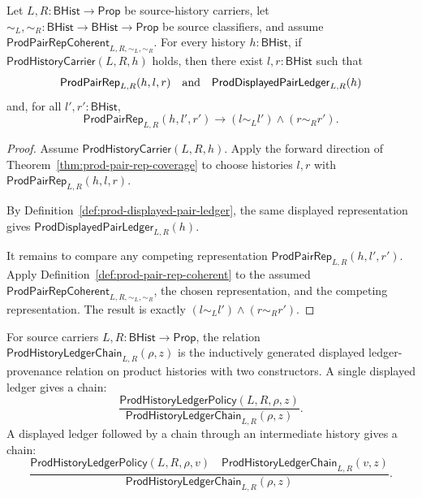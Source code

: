 \begin{theorem}
\label{thm:prod-carrier-single-valued-displayed-pair-readback}
Let $L,R:\mathsf{BHist}\to\mathsf{Prop}$ be source-history carriers, let
$\sim_L,\sim_R:\mathsf{BHist}\to\mathsf{BHist}\to\mathsf{Prop}$ be source
classifiers, and assume $\mathsf{ProdPairRepCoherent}_{L,R,\sim_L,\sim_R}$.
For every history $h:\mathsf{BHist}$, if
$\mathsf{ProdHistoryCarrier}(L,R,h)$ holds, then there exist
$l,r:\mathsf{BHist}$ such that
$$
\mathsf{ProdPairRep}_{L,R}(h,l,r)
\quad\hbox{and}\quad
\mathsf{ProdDisplayedPairLedger}_{L,R}(h)
$$
and, for all $l',r':\mathsf{BHist}$,
$$
\mathsf{ProdPairRep}_{L,R}(h,l',r')
\to
(l\sim_L l')\wedge(r\sim_R r').
$$
\end{theorem}
\begin{proof}
Assume $\mathsf{ProdHistoryCarrier}(L,R,h)$. Apply the forward direction of
Theorem~\ref{thm:prod-pair-rep-coverage} to choose histories $l,r$ with
$\mathsf{ProdPairRep}_{L,R}(h,l,r)$.

By Definition~\ref{def:prod-displayed-pair-ledger}, the same displayed
representation gives $\mathsf{ProdDisplayedPairLedger}_{L,R}(h)$.

It remains to compare any competing representation
$\mathsf{ProdPairRep}_{L,R}(h,l',r')$. Apply
Definition~\ref{def:prod-pair-rep-coherent} to the assumed
$\mathsf{ProdPairRepCoherent}_{L,R,\sim_L,\sim_R}$, the chosen representation,
and the competing representation. The result is exactly
$(l\sim_L l')\wedge(r\sim_R r')$.
\end{proof}

\begin{definition}
\label{def:prod-history-ledger-chain}
For source carriers $L,R:\mathsf{BHist}\to\mathsf{Prop}$, the relation
$\mathsf{ProdHistoryLedgerChain}_{L,R}(\rho,z)$ is the inductively generated
displayed ledger-provenance relation on product histories with two
constructors. A single displayed ledger gives a chain:
$$
\frac{\mathsf{ProdHistoryLedgerPolicy}(L,R,\rho,z)}
{\mathsf{ProdHistoryLedgerChain}_{L,R}(\rho,z)}.
$$
A displayed ledger followed by a chain through an intermediate history gives a
chain:
$$
\frac{\mathsf{ProdHistoryLedgerPolicy}(L,R,\rho,v)\quad
\mathsf{ProdHistoryLedgerChain}_{L,R}(v,z)}
{\mathsf{ProdHistoryLedgerChain}_{L,R}(\rho,z)}.
$$
\end{definition}


